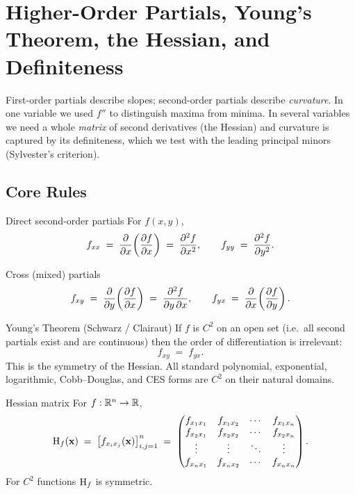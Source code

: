 \chapter{Higher-Order Partials, Young's Theorem, the Hessian, and Definiteness}

First-order partials describe slopes; second-order partials describe
\emph{curvature}. In one variable we used $f''$ to distinguish maxima from
minima. In several variables we need a whole \emph{matrix} of second
derivatives (the Hessian) and curvature is captured by its
definiteness, which we test with the leading principal minors (Sylvester's
criterion).

\section{Core Rules}

\begin{rulebox}{Direct second-order partials}
For $f(x,y)$,
\[
  f_{xx} \;=\; \frac{\partial }{\partial x}\!\left(\frac{\partial f}{\partial x}\right) \;=\; \frac{\partial^{2} f}{\partial x^{2}},
  \qquad
  f_{yy} \;=\; \frac{\partial^{2} f}{\partial y^{2}} .
\]
\end{rulebox}

\begin{rulebox}{Cross (mixed) partials}
\[
  f_{xy} \;=\; \frac{\partial }{\partial y}\!\left(\frac{\partial f}{\partial x}\right) \;=\; \frac{\partial^{2} f}{\partial y\,\partial x},
  \qquad
  f_{yx} \;=\; \frac{\partial }{\partial x}\!\left(\frac{\partial f}{\partial y}\right) .
\]
\end{rulebox}

\begin{rulebox}{Young's Theorem (Schwarz / Clairaut)}
If $f$ is $C^{2}$ on an open set (i.e.\ all second partials exist and
are continuous) then the order of differentiation is irrelevant:
\[
  f_{xy} \;=\; f_{yx} .
\]
This is the symmetry of the Hessian. All standard polynomial, exponential,
logarithmic, Cobb--Douglas, and CES forms are $C^{2}$ on their natural
domains.
\end{rulebox}

\begin{rulebox}{Hessian matrix}
For $f:\mathbb{R}^{n}\to\mathbb{R}$,
\[
  \operatorname{H}_f(\mathbf{x}) \;=\; \bigl[f_{x_ix_j}(\mathbf{x})\bigr]_{i,j=1}^{n}
  \;=\;
  \begin{pmatrix}
    f_{x_1x_1} & f_{x_1x_2} & \cdots & f_{x_1x_n} \\
    f_{x_2x_1} & f_{x_2x_2} & \cdots & f_{x_2x_n} \\
    \vdots     & \vdots     & \ddots & \vdots     \\
    f_{x_nx_1} & f_{x_nx_2} & \cdots & f_{x_nx_n}
  \end{pmatrix} .
\]
For $C^{2}$ functions $\operatorname{H}_f$ is symmetric.
\end{rulebox}

